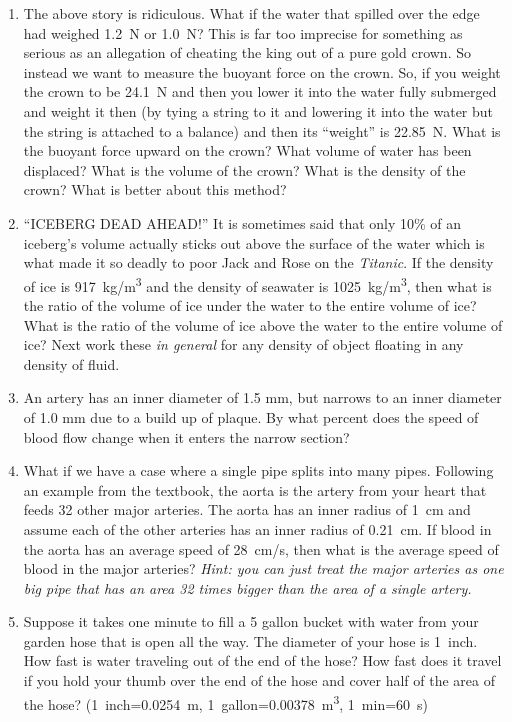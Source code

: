\begin{enumerate}
	\item
	The above story is ridiculous. What if the water that spilled over the edge had weighed \SI{1.2}{\newton} or \SI{1.0}{\newton}? This is far too imprecise for something as serious as an allegation of cheating the king out of a pure gold crown. So instead we want to measure the buoyant force on the crown. So, if you weight the crown to be \SI{24.1}{\newton} and then you lower it into the water fully submerged and weight it then (by tying a string to it and lowering it into the water but the string is attached to a balance) and then its ``weight'' is \SI{22.85}{\newton}. What is the buoyant force upward on the crown? What volume of water has been displaced? What is the volume of the crown? What is the density of the crown? What is better about this method?
	\bigskip
	
	\item
	``ICEBERG DEAD AHEAD!'' It is sometimes said that only 10\% of an iceberg's volume actually sticks out above the surface of the water which is what made it so deadly to poor Jack and Rose on the \emph{Titanic}. If the density of ice is \SI{917}{\kg/m^3} and the density of seawater is \SI{1025}{kg/m^3}, then what is the ratio of the volume of ice under the water to the entire volume of ice? What is the ratio of the volume of ice above the water to the entire volume of ice?  Next work these \emph{in general} for any density of object floating in any density of fluid. 
	
	\item
	An artery has an inner diameter of 1.5 mm, but narrows to an inner diameter of 1.0 mm due to a build up of plaque. By what percent does the speed of blood flow change when it enters the narrow section?
	
	\item 
	What if we have a case where a single pipe splits into many pipes. Following an example from the textbook, the aorta is the artery from your heart that feeds 32 other major arteries. The aorta has an inner radius of \SI{1}{cm} and assume each of the other arteries has an inner radius of \SI{0.21}{cm}. If blood in the aorta has an average speed of \SI{28}{cm/s}, then what is the average speed of blood in the major arteries? \emph{Hint: you can just treat the major arteries as one big pipe that has an area 32 times bigger than the area of a single artery.}
	
	\item
	Suppose it takes one minute to fill a 5 gallon bucket with water from your garden hose that is open all the way. The diameter of your hose is \SI{1}{inch}. How fast is water traveling out of the end of the hose? How fast does it travel if you hold your thumb over the end of the hose and cover half of the area of the hose? (\SI{1}{inch}=\SI{0.0254}{m}, \SI{1}{gallon}=\SI{0.00378}{m^3}, \SI{1}{min}=\SI{60}{s})
	

\end{enumerate}
